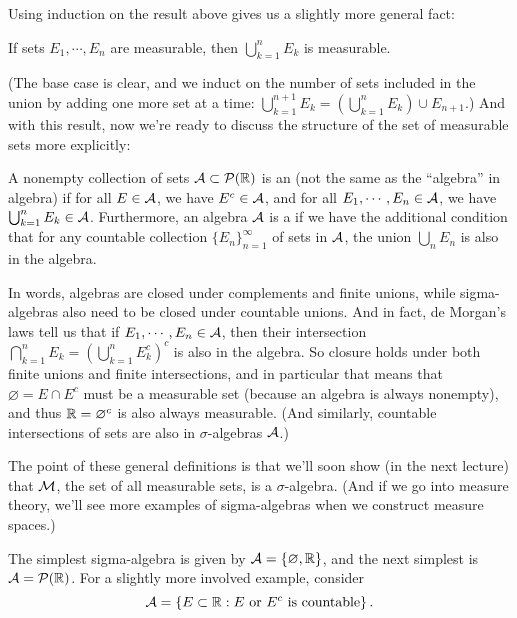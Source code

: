 Using induction on the result above gives us a slightly more general fact:

\begin{corollary}
If sets $E_1, \cdots, E_n$ are measurable, then $\bigcup_{k=1}^n E_k$ is measurable.
\end{corollary}

(The base case is clear, and we induct on the number of sets included in the union by adding one more set at a time: $\bigcup_{k=1}^{n+1} E_k = \left(\bigcup_{k=1}^n E_k\right) \cup E_{n+1}$.) And with this result, now we're ready to discuss the structure of the set of measurable sets more explicitly:

\begin{definition}
A nonempty collection of sets $\mathcal{A} \subset \mathcal{P}(\mathbb R)$ is an  (not the same as the ``algebra'' in algebra) if for all $E \in \mathcal{A}$, we have $E^c \in \mathcal{A}$, and for all $E_1, \cdots, E_n \in \mathcal{A}$, we have $\bigcup_{k=1}^n E_k \in \mathcal{A}$. Furthermore, an algebra $\mathcal{A}$ is a  if we have the additional condition that for any countable collection $\{E_n\}_{n=1}^\infty$ of sets in $\mathcal{A}$, the union $\bigcup_n E_n$ is also in the algebra.
\end{definition}

In words, algebras are closed under complements and finite unions, while sigma-algebras also need to be closed under countable unions. And in fact, de Morgan's laws tell us that if $E_1, \cdots, E_n \in \mathcal{A}$, then their intersection $\bigcap_{k=1}^n E_k = \left(\bigcup_{k=1}^n E_k^c\right)^c$ is also in the algebra. So closure holds under both finite unions and finite intersections, and in particular that means that $\varnothing = E \cap E^c$ must be a measurable set (because an algebra is always nonempty), and thus $\mathbb R = \varnothing^c$ is also always measurable. (And similarly, countable intersections of sets are also in $\sigma$-algebras $\mathcal{A}$.)

The point of these general definitions is that we'll soon show (in the next lecture) that $\mathcal{M}$, the set of all measurable sets, is a $\sigma$-algebra. (And if we go into measure theory, we'll see more examples of sigma-algebras when we construct measure spaces.)

\begin{example}
The simplest sigma-algebra is given by $\mathcal{A} = \{\varnothing, \mathbb R\}$, and the next simplest is $\mathcal{A} = \mathcal{P}(\mathbb R)$. For a slightly more involved example, consider 
\[
    \mathcal{A} = \left\{E \subset \mathbb R: E \text{ or }E^c \text{ is countable} \right\}.
\]
\end{example}

